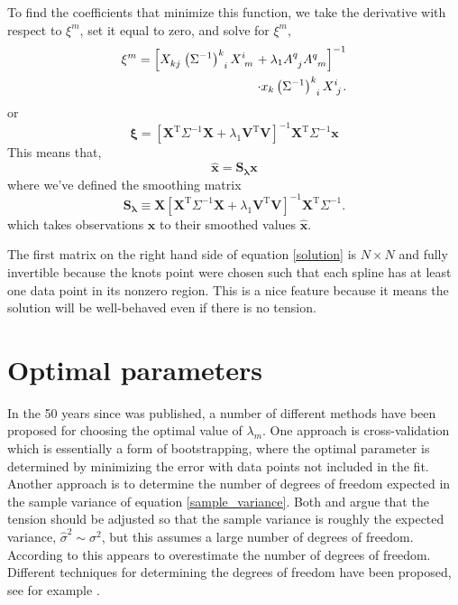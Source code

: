\documentclass[twocol]{ametsoc}
\begin{document}
To find the coefficients that minimize this function, we take the derivative with respect to $\xi^m$, set it equal to zero, and solve for $\xi^m$,
\begin{equation}
\begin{split}
\xi^m = \left[ X\indices{_k_j} \left(\Sigma^{-1}\right)\indices{^k_i}  X\indices{^i_m} + \lambda_1 {A}\indices{^q_j}{A}\indices{^q_m} \right]^{-1} \\
\cdot x_k \left(\Sigma^{-1}\right)\indices{^k_i}   X\indices{^i_j}.
\end{split}
\label{solution}
\end{equation}
or
\begin{equation}
\mathbf{\xi} = \left[ \mathbf{X}^{\textrm{T}} \Sigma^{-1} \mathbf{X} + \lambda_1 \mathbf{V}^{\textrm{T}} \mathbf{V} \right]^{-1} \mathbf{X}^{\textrm{T}} \Sigma^{-1} \mathbf{x}
\end{equation}
This means that,
\begin{equation}
\mathbf{\hat{x}} = \mathbf{S_\lambda} \mathbf{x}
\end{equation}
where we've defined the smoothing matrix
\begin{equation}
\label{smoothing-operator}
\mathbf{S_\lambda} \equiv \mathbf{X} \left[ \mathbf{X}^{\textrm{T}} \Sigma^{-1} \mathbf{X} + \lambda_1 \mathbf{V}^{\textrm{T}} \mathbf{V} \right]^{-1} \mathbf{X}^{\textrm{T}} \Sigma^{-1}.
\end{equation}
which takes observations $\mathbf{x}$ to their smoothed values $\mathbf{\hat{x}}$.

The first matrix on the right hand side of equation \ref{solution} is $N\times N$ and fully invertible because the knots point were chosen such that each spline has at least one data point in its nonzero region. This is a nice feature because it means the solution will be well-behaved even if there is no tension.


%
\section{Optimal parameters} \label{optimal_parameter}
%

In the 50 years since \citet{reinsch1967-nm} was published, a number of different methods have been proposed for choosing the optimal value of $\lambda_m$. One approach is cross-validation \citep{wahba1978-jrss-b,craven1979-nm} which is essentially a form of bootstrapping, where the optimal parameter is determined by minimizing the error with data points not included in the fit. Another approach is to determine the number of degrees of freedom expected in the sample variance of equation \ref{sample_variance}. Both \citet{reinsch1967-nm} and \citet{teanby2007-mg} argue that the tension should be adjusted so that the sample variance is roughly the expected variance, $\hat{\sigma}^2 \sim \sigma^2$, but this assumes a large number of degrees of freedom. According to \citet{wahba1990-siam} this appears to overestimate the number of degrees of freedom. Different techniques for determining the degrees of freedom have been proposed, see for example \citet{cantoni2002-biom}.
\end{document}
